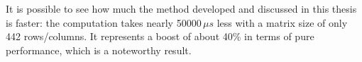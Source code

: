 
It is possible to see how much the method developed and discussed in this thesis is faster: the computation takes nearly 50000\(\,\mu{s} \) less with a matrix size of only 442 rows/columns. It represents a boost of about 40\% in terms of pure performance, which is a noteworthy result.